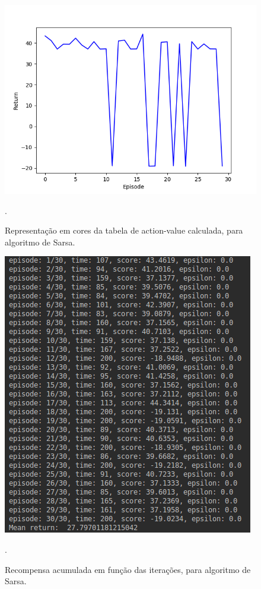 \documentclass[conference]{IEEEtran}
\begin{document}
\begin{figure}[htbp]
\centering
\centerline{\includegraphics[scale=0.5]{imagens/dqn_evaluation.png}}
\caption{Representação em cores da tabela de action-value calculada, para algoritmo de Sarsa.}.
\label{dqn_evaluation}
\end{figure}

\begin{figure}[htbp]
\centering
\centerline{\includegraphics[scale=0.4]{imagens/evaluate_dqn_result.png}}
\caption{Recompensa acumulada em função das iterações, para algoritmo de Sarsa.}.
\label{evaluate_dqn_result}
\end{figure}
	
\end{document}
